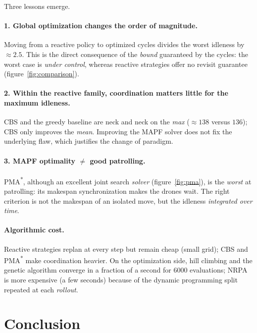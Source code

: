 \documentclass[11pt,a4paper]{article}
\begin{document}
Three lessons emerge.

\paragraph{1. Global optimization changes the order of magnitude.} Moving from
a reactive policy to optimized cycles divides the worst idleness by
$\approx 2.5$. This is the direct consequence of the \emph{bound} guaranteed by
the cycles: the worst case is \emph{under control}, whereas reactive strategies
offer no revisit guarantee (figure~\ref{fig:comparison}).

\paragraph{2. Within the reactive family, coordination matters little for the
maximum idleness.} CBS and the greedy baseline are neck and neck on the
\emph{max} ($\approx 138$ versus $136$); CBS only improves the \emph{mean}.
Improving the MAPF solver does not fix the underlying flaw, which justifies the
change of paradigm.

\paragraph{3. MAPF optimality $\ne$ good patrolling.}
PMA\textsuperscript{*}, although an excellent joint search \emph{solver}
(figure~\ref{fig:pma}), is the \emph{worst} at patrolling: its makespan
synchronization makes the drones wait. The right criterion is not the makespan
of an isolated move, but the idleness \emph{integrated over time}.

\paragraph{Algorithmic cost.} Reactive strategies replan at every step but remain
cheap (small grid); CBS and PMA\textsuperscript{*} make coordination heavier. On
the optimization side, hill climbing and the genetic algorithm converge in a
fraction of a second for $6000$ evaluations; NRPA is more expensive (a few
seconds) because of the dynamic programming split repeated at each
\emph{rollout}.

\section{Conclusion}
\end{document}

